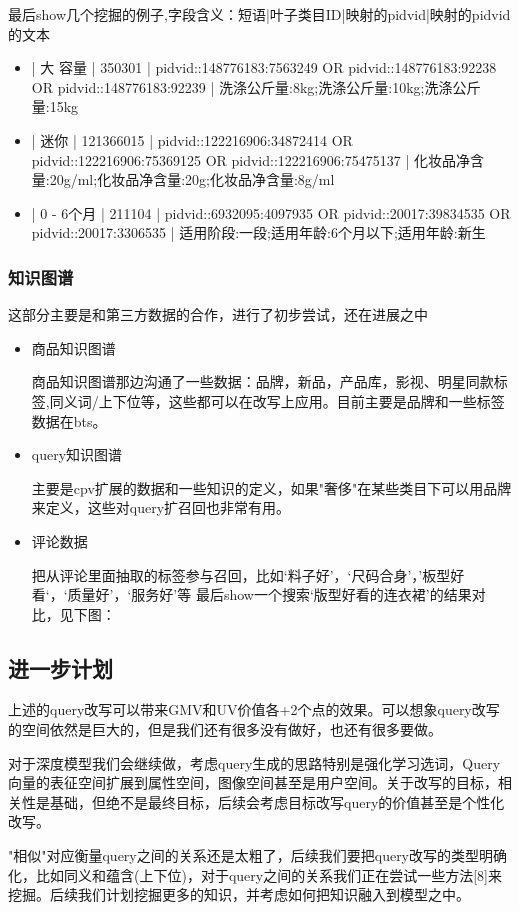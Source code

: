 最后show几个挖掘的例子,字段含义：短语|叶子类目ID|映射的pidvid|映射的pidvid的文本
\begin{itemize}
\item | 大 容量 | 350301 | pidvid::148776183:7563249 OR pidvid::148776183:92238 OR pidvid::148776183:92239 | 洗涤公斤量:8kg;洗涤公斤量:10kg;洗涤公斤量:15kg
\item | 迷你 | 121366015 | pidvid::122216906:34872414 OR pidvid::122216906:75369125 OR pidvid::122216906:75475137 | 化妆品净含量:20g/ml;化妆品净含量:20g;化妆品净含量:8g/ml
\item | 0 - 6个月 | 211104 | pidvid::6932095:4097935 OR pidvid::20017:39834535 OR pidvid::20017:3306535 | 适用阶段:一段;适用年龄:6个月以下;适用年龄:新生
\end{itemize}
\subsubsection{知识图谱}
这部分主要是和第三方数据的合作，进行了初步尝试，还在进展之中
\begin{itemize}
\item 商品知识图谱
\par 商品知识图谱那边沟通了一些数据：品牌，新品，产品库，影视、明星同款标签,同义词/上下位等，这些都可以在改写上应用。目前主要是品牌和一些标签数据在bts。
\item query知识图谱
\par 主要是cpv扩展的数据和一些知识的定义，如果"奢侈"在某些类目下可以用品牌来定义，这些对query扩召回也非常有用。
\item 评论数据
\par 把从评论里面抽取的标签参与召回，比如‘料子好’，‘尺码合身’，’板型好看‘，‘质量好’，‘服务好’等
最后show一个搜索‘版型好看的连衣裙’的结果对比，见下图：
\end{itemize}

\subsection{进一步计划}
上述的query改写可以带来GMV和UV价值各+2个点的效果。可以想象query改写的空间依然是巨大的，但是我们还有很多没有做好，也还有很多要做。
\par 对于深度模型我们会继续做，考虑query生成的思路特别是强化学习选词，Query向量的表征空间扩展到属性空间，图像空间甚至是用户空间。关于改写的目标，相关性是基础，但绝不是最终目标，后续会考虑目标改写query的价值甚至是个性化改写。
\par "相似"对应衡量query之间的关系还是太粗了，后续我们要把query改写的类型明确化，比如同义和蕴含(上下位)，对于query之间的关系我们正在尝试一些方法[8]来挖掘。后续我们计划挖掘更多的知识，并考虑如何把知识融入到模型之中。

